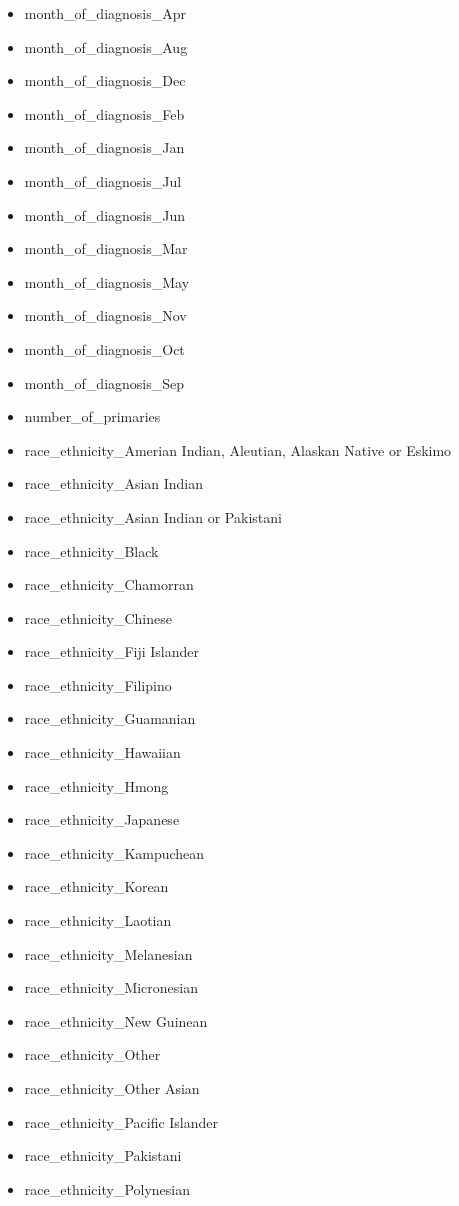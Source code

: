 \documentclass[a4paper,11pt]{article}
\begin{document}
\begin{itemize}[noitemsep]
\item month\_of\_diagnosis\_Apr
\item month\_of\_diagnosis\_Aug
\item month\_of\_diagnosis\_Dec
\item month\_of\_diagnosis\_Feb
\item month\_of\_diagnosis\_Jan
\item month\_of\_diagnosis\_Jul
\item month\_of\_diagnosis\_Jun
\item month\_of\_diagnosis\_Mar
\item month\_of\_diagnosis\_May
\item month\_of\_diagnosis\_Nov
\item month\_of\_diagnosis\_Oct
\item month\_of\_diagnosis\_Sep
\item number\_of\_primaries
\item race\_ethnicity\_Amerian Indian, Aleutian, Alaskan Native or Eskimo
\item race\_ethnicity\_Asian Indian
\item race\_ethnicity\_Asian Indian or Pakistani
\item race\_ethnicity\_Black
\item race\_ethnicity\_Chamorran
\item race\_ethnicity\_Chinese
\item race\_ethnicity\_Fiji Islander
\item race\_ethnicity\_Filipino
\item race\_ethnicity\_Guamanian
\item race\_ethnicity\_Hawaiian
\item race\_ethnicity\_Hmong
\item race\_ethnicity\_Japanese
\item race\_ethnicity\_Kampuchean
\item race\_ethnicity\_Korean
\item race\_ethnicity\_Laotian
\item race\_ethnicity\_Melanesian
\item race\_ethnicity\_Micronesian
\item race\_ethnicity\_New Guinean
\item race\_ethnicity\_Other
\item race\_ethnicity\_Other Asian
\item race\_ethnicity\_Pacific Islander
\item race\_ethnicity\_Pakistani
\item race\_ethnicity\_Polynesian

\end{itemize}
\end{document}
